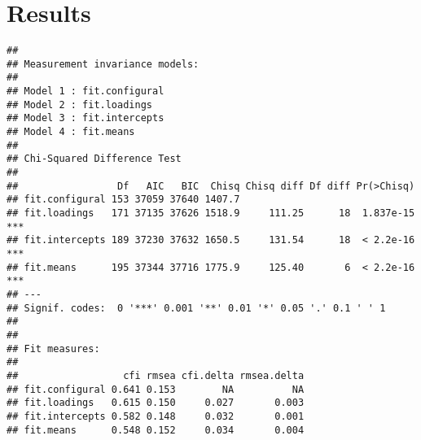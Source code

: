 \documentclass[
  english,
  man]{apa6}
\begin{document}
\hypertarget{results}{%
\section{Results}\label{results}}

\begin{verbatim}
## 
## Measurement invariance models:
## 
## Model 1 : fit.configural
## Model 2 : fit.loadings
## Model 3 : fit.intercepts
## Model 4 : fit.means
## 
## Chi-Squared Difference Test
## 
##                 Df   AIC   BIC  Chisq Chisq diff Df diff Pr(>Chisq)    
## fit.configural 153 37059 37640 1407.7                                  
## fit.loadings   171 37135 37626 1518.9     111.25      18  1.837e-15 ***
## fit.intercepts 189 37230 37632 1650.5     131.54      18  < 2.2e-16 ***
## fit.means      195 37344 37716 1775.9     125.40       6  < 2.2e-16 ***
## ---
## Signif. codes:  0 '***' 0.001 '**' 0.01 '*' 0.05 '.' 0.1 ' ' 1
## 
## 
## Fit measures:
## 
##                  cfi rmsea cfi.delta rmsea.delta
## fit.configural 0.641 0.153        NA          NA
## fit.loadings   0.615 0.150     0.027       0.003
## fit.intercepts 0.582 0.148     0.032       0.001
## fit.means      0.548 0.152     0.034       0.004
\end{verbatim}
\end{document}
